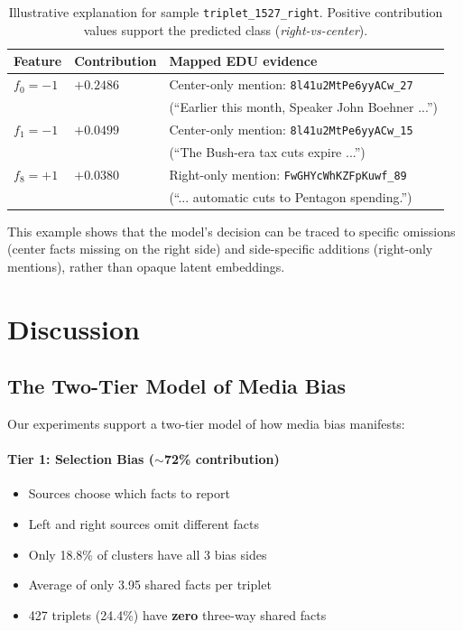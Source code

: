 \documentclass[11pt]{article}
\begin{document}
\begin{table}[t]
\centering
\footnotesize
\setlength{\tabcolsep}{3pt}
\begin{tabularx}{\columnwidth}{
    >{\raggedright\arraybackslash}p{}
    >{\raggedright\arraybackslash}p{}
    >{\raggedright\arraybackslash}X
}
\toprule
\textbf{Feature} & \textbf{Contribution} & \textbf{Mapped EDU evidence} \\
\midrule
$f_0=-1$ & $+0.2486$ & Center-only mention: \texttt{8l41u2MtPe6yyACw\_27}\\
& & (``Earlier this month, Speaker John Boehner ...'') \\[2pt]

$f_1=-1$ & $+0.0499$ & Center-only mention: \texttt{8l41u2MtPe6yyACw\_15}\\
& & (``The Bush-era tax cuts expire ...'') \\[2pt]

$f_8=+1$ & $+0.0380$ & Right-only mention: \texttt{FwGHYcWhKZFpKuwf\_89}\\
& & (``... automatic cuts to Pentagon spending.'') \\
\bottomrule
\end{tabularx}
\caption{Illustrative explanation for sample \texttt{triplet\_1527\_right}. Positive contribution values support the predicted class (\textit{right-vs-center}).}
\label{tab:explainable-example}
\end{table}

This example shows that the model's decision can be traced to specific omissions (center facts missing on the right side) and side-specific additions (right-only mentions), rather than opaque latent embeddings.

\section{Discussion}

\subsection{The Two-Tier Model of Media Bias}

Our experiments support a two-tier model of how media bias manifests:

\paragraph{Tier 1: Selection Bias ($\sim$72\% contribution)}
\begin{itemize}
    \item Sources choose which facts to report
    \item Left and right sources omit different facts
    \item Only 18.8\% of clusters have all 3 bias sides
    \item Average of only 3.95 shared facts per triplet
    \item 427 triplets (24.4\%) have \textbf{zero} three-way shared facts
\end{itemize}
\end{document}

